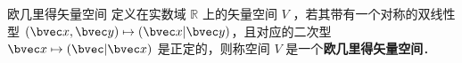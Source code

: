 \begin{definition}{欧几里得矢量空间}
定义在实数域 $\mathbb R$ 上的矢量空间 $V$ ，若其带有一个对称的双线性型 $(\bvec x,\bvec y)\mapsto(\bvec x|\bvec y)$，且对应的二次型 $\bvec x\mapsto(\bvec |\bvec x)$ 是正定的，则称空间 $V$ 是一个\textbf{欧几里得矢量空间}．
\end{definition}
